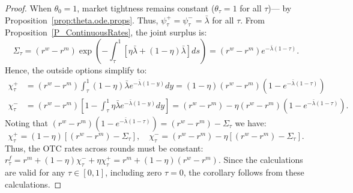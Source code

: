 \begin{proof}
When $\theta_0 = 1$, market tightness remains constant ($\theta_{\tau} = 1$ for all $\tau$)--- by Proposition~\ref{prop:theta.ode.props}. Thus, $\psi_{\tau}^{+} = \psi_{\tau}^{-} = \bar{\lambda}$ for all $\tau$. From Proposition~\ref{P_ContinuousRates}, the joint surplus is:
\[
\Sigma_{\tau} = (r^{w} - r^{m})\exp\left(-\int_{\tau}^{1}[\eta\bar{\lambda} + (1-\eta)\bar{\lambda}]ds\right) = (r^{w} - r^{m})e^{-\bar{\lambda}(1-\tau)}.
\]
Hence, the outside options simplify to:
\begin{align*}
\chi_{\tau}^{+} &= (r^{w} - r^{m})\int_{\tau}^{1}(1-\eta)\bar{\lambda}e^{-\bar{\lambda}(1-y)}dy = (1-\eta)(r^{w} - r^{m})(1 - e^{-\bar{\lambda}(1-\tau)})\\
\chi_{\tau}^{-} &= (r^{w} - r^{m})\left[1 - \int_{\tau}^{1}\eta\bar{\lambda}e^{-\bar{\lambda}(1-y)}dy\right] = (r^{w} - r^{m}) - \eta(r^{w} - r^{m})(1 - e^{-\bar{\lambda}(1-\tau)}).
\end{align*}
Noting that $(r^{w} - r^{m})(1 - e^{-\bar{\lambda}(1-\tau)}) = (r^{w} - r^{m}) - \Sigma_{\tau}$ we have:
\[
\chi_{\tau}^{+} = (1-\eta)[(r^{w} - r^{m}) - \Sigma_{\tau}], \quad \chi_{\tau}^{-} = (r^{w} - r^{m}) - \eta[(r^{w} - r^{m}) - \Sigma_{\tau}].
\]
Thus, the OTC rates across rounds must be constant: $r_{\tau}^{f} = r^{m} + (1-\eta)\chi_{\tau}^{-} + \eta\chi_{\tau}^{+} = r^{m} + (1-\eta)(r^{w} - r^{m})$. Since the calculations are valid for any $\tau\in\left[0,1\right]$, including zero $\tau=0$, the corollary follows from these calculations. 
\end{proof}
